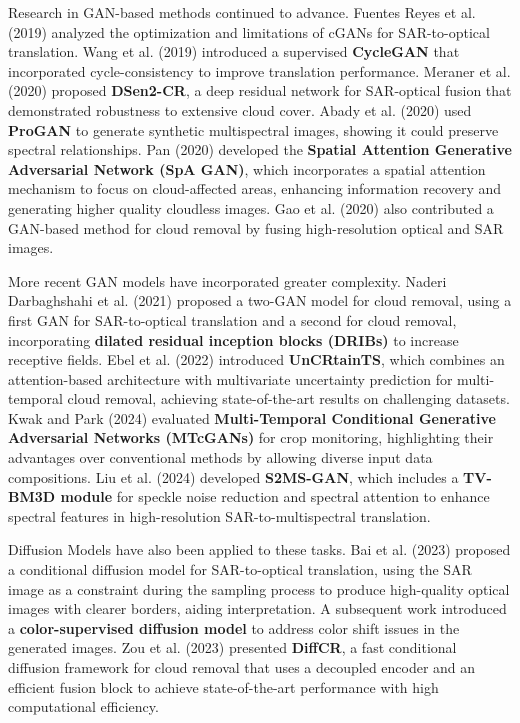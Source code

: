 Research in GAN-based methods continued to advance. Fuentes Reyes et al. (2019) analyzed the optimization and limitations of cGANs for SAR-to-optical translation. Wang et al. (2019) introduced a supervised \textbf{CycleGAN} that incorporated cycle-consistency to improve translation performance. Meraner et al. (2020) proposed \textbf{DSen2-CR}, a deep residual network for SAR-optical fusion that demonstrated robustness to extensive cloud cover. Abady et al. (2020) used \textbf{ProGAN} to generate synthetic multispectral images, showing it could preserve spectral relationships. Pan (2020) developed the \textbf{Spatial Attention Generative Adversarial Network (SpA GAN)}, which incorporates a spatial attention mechanism to focus on cloud-affected areas, enhancing information recovery and generating higher quality cloudless images. Gao et al. (2020) also contributed a GAN-based method for cloud removal by fusing high-resolution optical and SAR images.

More recent GAN models have incorporated greater complexity. Naderi Darbaghshahi et al. (2021) proposed a two-GAN model for cloud removal, using a first GAN for SAR-to-optical translation and a second for cloud removal, incorporating \textbf{dilated residual inception blocks (DRIBs)} to increase receptive fields. Ebel et al. (2022) introduced \textbf{UnCRtainTS}, which combines an attention-based architecture with multivariate uncertainty prediction for multi-temporal cloud removal, achieving state-of-the-art results on challenging datasets. Kwak and Park (2024) evaluated \textbf{Multi-Temporal Conditional Generative Adversarial Networks (MTcGANs)} for crop monitoring, highlighting their advantages over conventional methods by allowing diverse input data compositions. Liu et al. (2024) developed \textbf{S2MS-GAN}, which includes a \textbf{TV-BM3D module} for speckle noise reduction and spectral attention to enhance spectral features in high-resolution SAR-to-multispectral translation.

Diffusion Models have also been applied to these tasks. Bai et al. (2023) proposed a conditional diffusion model for SAR-to-optical translation, using the SAR image as a constraint during the sampling process to produce high-quality optical images with clearer borders, aiding interpretation. A subsequent work introduced a \textbf{color-supervised diffusion model} to address color shift issues in the generated images. Zou et al. (2023) presented \textbf{DiffCR}, a fast conditional diffusion framework for cloud removal that uses a decoupled encoder and an efficient fusion block to achieve state-of-the-art performance with high computational efficiency.

